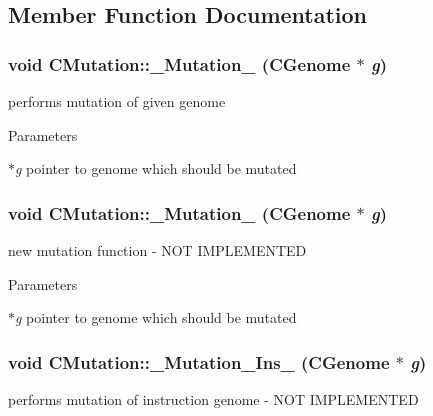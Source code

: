 \subsection{Member Function Documentation}
\hypertarget{classCMutation_abaf0adf86b76dcce975cb6a10173730d}{
\subsubsection[{\_\-Mutation\_\-01}]{\setlength{\rightskip}{0pt plus 5cm}void CMutation::\_\-Mutation\_ ({\bf CGenome} $\ast$ {\em g})}}
\label{classCMutation_abaf0adf86b76dcce975cb6a10173730d}
performs mutation of given genome


\begin{DoxyParams}{Parameters}
\item[{\em $\ast$g}]pointer to genome which should be mutated \end{DoxyParams}
\hypertarget{classCMutation_a9ea86e30d04f615dca21f594f51ec491}{
\subsubsection[{\_\-Mutation\_\-02}]{\setlength{\rightskip}{0pt plus 5cm}void CMutation::\_\-Mutation\_ ({\bf CGenome} $\ast$ {\em g})}}
\label{classCMutation_a9ea86e30d04f615dca21f594f51ec491}
new mutation function -\/ NOT IMPLEMENTED


\begin{DoxyParams}{Parameters}
\item[{\em $\ast$g}]pointer to genome which should be mutated \end{DoxyParams}
\hypertarget{classCMutation_a1a38ef4c6a010eebddacc6eaf1b9e758}{
\subsubsection[{\_\-Mutation\_\-Ins\_\-01}]{\setlength{\rightskip}{0pt plus 5cm}void CMutation::\_\-Mutation\_\-Ins\_ ({\bf CGenome} $\ast$ {\em g})}}
\label{classCMutation_a1a38ef4c6a010eebddacc6eaf1b9e758}
performs mutation of instruction genome -\/ NOT IMPLEMENTED


